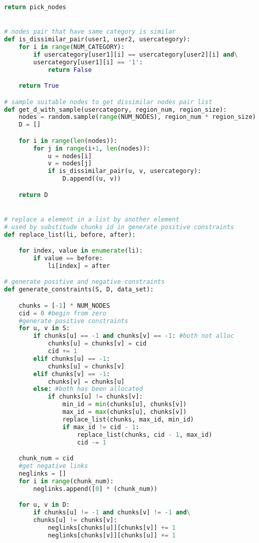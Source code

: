 \begin{lstlisting}[language={python}, caption={生成正语境限制和负语境限制}, label=code:constraint]
    return pick_nodes


# nodes pair that have same category is similar
def is_dissimilar_pair(user1, user2, usercategory):
    for i in range(NUM_CATEGORY):
        if usercategory[user1][i] == usercategory[user2][i] and\
        usercategory[user1][i] == '1':
            return False

    return True

# sample suitable nodes to get dissimilar nodes pair list
def get_d_with_sample(usercategory, region_num, region_size):
    nodes = random.sample(range(NUM_NODES), region_num * region_size)
    D = []

    for i in range(len(nodes)):
        for j in range(i+1, len(nodes)):
            u = nodes[i]
            v = nodes[j]
            if is_dissimilar_pair(u, v, usercategory):
                D.append((u, v))

    return D


# replace a element in a list by another element
# used by substitude chunks id in generate positive constraints
def replace_list(li, before, after):

    for index, value in enumerate(li):
        if value == before:
            li[index] = after

# generate positive and negative constraints
def generate_constraints(S, D, data_set):

    chunks = [-1] * NUM_NODES
    cid = 0 #begin from zero
    #generate positive constraints
    for u, v in S:
        if chunks[u] == -1 and chunks[v] == -1: #both not alloc
            chunks[u] = chunks[v] = cid
            cid += 1
        elif chunks[u] == -1:
            chunks[u] = chunks[v]
        elif chunks[v] == -1:
            chunks[v] = chunks[u]
        else: #both has been allocated
            if chunks[u] != chunks[v]:
                min_id = min(chunks[u], chunks[v])
                max_id = max(chunks[u], chunks[v])
                replace_list(chunks, max_id, min_id)
                if max_id != cid - 1:
                    replace_list(chunks, cid - 1, max_id)
                    cid -= 1

    chunk_num = cid
    #get negative links
    neglinks = []
    for i in range(chunk_num):
        neglinks.append([0] * (chunk_num))

    for u, v in D:
        if chunks[u] != -1 and chunks[v] != -1 and\
        chunks[u] != chunks[v]:
            neglinks[chunks[u]][chunks[v]] += 1
            neglinks[chunks[v]][chunks[u]] += 1


\end{lstlisting}
